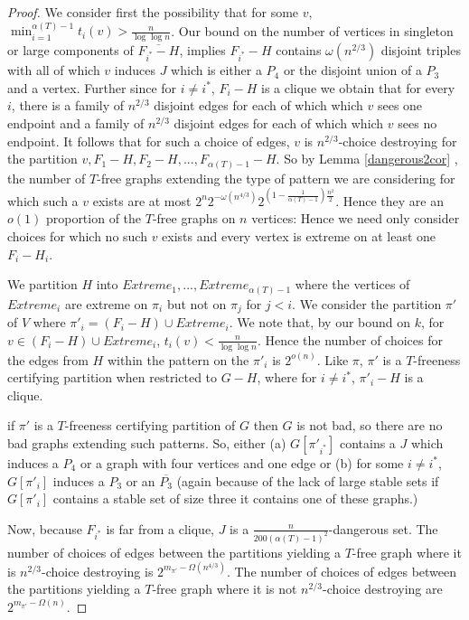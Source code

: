 \documentclass[12pt]{article}
\theoremstyle{definition}
\begin{document}
\begin{proof}
We consider first the possibility that for some $v$, $\min_{i=1}^{\alpha(T)-1} t_i(v)> \frac{n}{\log \log n}$. 
Our bound on the number of  vertices in singleton or large components   of $\overline {F_{i^*}-H}$, implies   $F_{i^*}-H$ contains 
 $\omega(n^{2/3})$ disjoint triples with  all of which  $v$ induces   $J$ which is either a $P_4$ or the disjoint union of a $P_3$ and a vertex. 
Further since for $i \neq i^*$, $F_i-H$ is a clique we obtain that for every $i$,
there is a family of  $n^{2/3}$ disjoint edges for  each of which which $v$ sees one endpoint and 
a family of $n^{2/3}$ disjoint  edges for  each of which which $v$ sees no  endpoint.
 It follows that  for such a choice of edges, $v$ is
$n^{2/3}$-choice destroying  for the partition $v,F_1-H,F_2-H,...,F_{\alpha(T)-1}-H$. 
So by Lemma \ref{dangerous2cor} , the  number  of $T$-free graphs  extending the type of pattern we are considering  for which such a $v$ exists are  at most 
$2^n2^{-\omega(n^{4/3})}2^{(1-\frac{1}{\alpha(T)-1})\frac{n^2}{2}}$. Hence they are     an $o(1)$ proportion of the $T$-free graphs on $n$ vertices: Hence we need only consider choices for which no such $v$ exists and every vertex is extreme on at least one $F_i-H_i$. 



We partition $H$ into $Extreme_1,...,Extreme_{\alpha(T)-1}$ where the vertices of $Extreme_i$ are extreme on $\pi_i$
but not on $\pi_j$ for $j<i$. 
We consider the partition $ \pi'$  of $V$ where $\pi'_i=(F_i-H) \cup Extreme_i$. 
We note that, by our bound on $k$, for $v \in  (F_i -H) \cup Extreme_i$, $t_i(v)<\frac{n}{\log \log n}$.
Hence  the number of choices for the edges from $H$ within the pattern on the  $\pi'_i$ is $2^{o(n)}$. 
Like $\pi$, $\pi'$  is a $T$-freeness certifying partition when restricted to $G-H$, where for $i \neq i^*$, $\pi'_i-H$ is a clique. 

if $\pi'$ is a $T$-freeness certifying partition of $G$ then $G$ is not bad, so there are no bad graphs extending such patterns. 
So, either (a)  $G[\pi'_{i^*}]$ contains a $J$ which induces a  $P_4$ or a graph with four vertices and one edge or 
(b) for some $i \neq i^*$, $G[\pi'_i]$ induces a $P_3$ or an $\overline{P_3}$ (again because of the lack of large stable sets 
if $G[\pi'_i]$ contains a stable set of size three it contains one of these graphs.)

Now, because $F_{i^*}$ is far from a clique,  $J$ is a $\frac{n}{200(\alpha(T)-1)^2}$-dangerous set. 
The number of choices of edges between the partitions yielding a $T$-free graph where it is $n^{2/3}$-choice destroying
is $2^{m_{\pi'}-\Omega(n^{4/3})}$. The number of choices of edges between the partitions yielding a $T$-free graph where it is not  $n^{2/3}$-choice 
destroying
are $2^{m_{\pi'}-\Omega(n)}$. 
\end{proof} 
\end{document}
